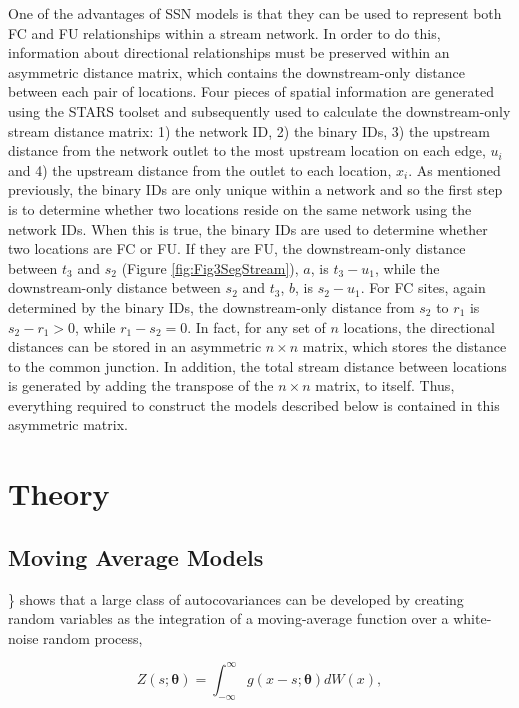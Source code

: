 \documentclass[]{book}
\theoremstyle{definition}
\theoremstyle{definition}
\theoremstyle{definition}
\theoremstyle{remark}
\begin{document}
One of the advantages of SSN models is that they can be used to
represent both FC and FU relationships within a stream network. In order
to do this, information about directional relationships must be
preserved within an asymmetric distance matrix, which contains the
downstream-only distance between each pair of locations. Four pieces of
spatial information are generated using the STARS toolset and
subsequently used to calculate the downstream-only stream distance
matrix: 1) the network ID, 2) the binary IDs, 3) the upstream distance
from the network outlet to the most upstream location on each edge,
\(u_i\) and 4) the upstream distance from the outlet to each location,
\(x_i\). As mentioned previously, the binary IDs are only unique within
a network and so the first step is to determine whether two locations
reside on the same network using the network IDs. When this is true, the
binary IDs are used to determine whether two locations are FC or FU. If
they are FU, the downstream-only distance between \(t_3\) and \(s_2\)
(Figure \ref{fig:Fig3SegStream}), \(a\), is \(t_3 - u_1\), while the
downstream-only distance between \(s_2\) and \(t_3\), \(b\), is
\(s_2 - u_1\). For FC sites, again determined by the binary IDs, the
downstream-only distance from \(s_2\) to \(r_1\) is \(s_2-r_1>0\), while
\(r_1-s_2=0\). In fact, for any set of \(n\) locations, the directional
distances can be stored in an asymmetric \(n \times n\) matrix, which
stores the distance to the common junction. In addition, the total
stream distance between locations is generated by adding the transpose
of the \(n \times n\) matrix, to itself. Thus, everything required to
construct the models described below is contained in this asymmetric
matrix.

\hypertarget{theory}{%
\chapter{Theory}\label{theory}}

\hypertarget{moving-average-models}{%
\section{Moving Average Models}\label{moving-average-models}}

\citet{Yagl:corr:1987}\} shows that a large class of autocovariances can
be developed by creating random variables as the integration of a
moving-average function over a white-noise random process,

\begin{equation} 
    Z(s;\boldsymbol{\theta}) = \int_{-\infty}^{\infty}g(x-s;\boldsymbol{\theta})dW(x),
    \label{eq:Zdef}
\end{equation}
\end{document}
